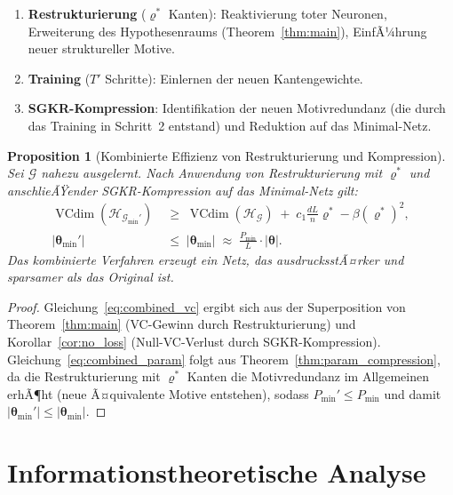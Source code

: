 ﻿\documentclass[12pt, a4paper, openany]{report}
\newtheorem{proposition}[theorem]{Proposition}
\newcommand{\calG}{\mathcal{G}}
\newcommand{\calH}{\mathcal{H}}
\DeclareMathOperator{\VC}{VCdim}
\begin{document}
\begin{enumerate}[label=(\arabic*)]
  \item \textbf{Restrukturierung} ($\varrho^*$ Kanten): Reaktivierung toter
    Neuronen, Erweiterung des Hypothesenraums (Theorem~\ref{thm:main}),
    EinfÃ¼hrung neuer struktureller Motive.
  \item \textbf{Training} ($T'$ Schritte): Einlernen der neuen Kantengewichte.
  \item \textbf{SGKR-Kompression}: Identifikation der neuen Motivredundanz
    (die durch das Training in Schritt~2 entstand) und Reduktion auf das
    Minimal-Netz.
\end{enumerate}

\begin{proposition}[Kombinierte Effizienz von Restrukturierung und Kompression]
\label{prop:combined_efficiency}
Sei $\calG$ nahezu ausgelernt.  Nach Anwendung von Restrukturierung mit
$\varrho^*$ und anschlieÃŸender SGKR-Kompression auf das Minimal-Netz gilt:
\begin{align}
  \label{eq:combined_vc}
  \VC(\calH_{\calG_{\min}'}) &\;\geq\; \VC(\calH_{\calG})
    \;+\; c_1\frac{dL}{n}\varrho^* - \beta(\varrho^*)^2, \\
  \label{eq:combined_param}
  |\bm{\theta}_{\min}'| &\;\leq\; |\bm{\theta}_{\min}|
    \;\approx\; \frac{P_{\min}}{L} \cdot |\bm{\theta}|.
\end{align}
Das kombinierte Verfahren erzeugt ein Netz, das
\emph{ausdrucksstÃ¤rker} \emph{und sparsamer} als das Original ist.
\end{proposition}

\begin{proof}
Gleichung~\eqref{eq:combined_vc} ergibt sich aus der Superposition von
Theorem~\ref{thm:main} (VC-Gewinn durch Restrukturierung) und
Korollar~\ref{cor:no_loss} (Null-VC-Verlust durch SGKR-Kompression).
Gleichung~\eqref{eq:combined_param} folgt aus Theorem~\ref{thm:param_compression},
da die Restrukturierung mit $\varrho^*$ Kanten die Motivredundanz im
Allgemeinen erhÃ¶ht (neue Ã¤quivalente Motive entstehen), sodass
$P_{\min}' \leq P_{\min}$ und damit $|\bm{\theta}_{\min}'| \leq |\bm{\theta}_{\min}|$.
\end{proof}

\chapter{Informationstheoretische Analyse}
\label{sec:information}
\end{document}
